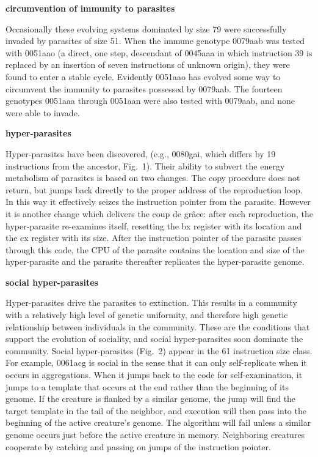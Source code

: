 \pagebreak
\LP
\bf circumvention of immunity to parasites\rm
\eLP

Occasionally these evolving systems dominated by size 79 were successfully
invaded by parasites of size 51.  When the immune genotype 0079aab was tested
with 0051aao (a direct, one step, descendant of 0045aaa in which instruction
39 is replaced by an insertion of seven instructions of unknown origin), they
were found to enter a stable cycle.  Evidently 0051aao has evolved some way to
circumvent the immunity to parasites possessed by 0079aab.  The fourteen
genotypes 0051aaa through 0051aan were also tested with 0079aab, and none were
able to invade.

\LP
\bf hyper-parasites\rm
\eLP

Hyper-parasites have been discovered, (e.g., 0080gai, which differs by 19
instructions from the ancestor, Fig.\ 1).  Their ability to subvert the energy
metabolism of parasites is based on two changes.  The copy procedure does not
return, but jumps back directly to the proper address of the reproduction loop.
In this way it effectively seizes the instruction pointer from the parasite.
However it is another change which delivers the coup de gr\^{a}ce: after
each reproduction, the hyper-parasite re-examines itself, resetting the bx
register with its location and the cx register with its size.  After the
instruction pointer of the parasite passes through this code, the CPU of the
parasite contains the location and size of the hyper-parasite and the
parasite thereafter replicates the hyper-parasite genome.

\LP
\bf social hyper-parasites\rm
\eLP

Hyper-parasites drive the parasites to extinction.  This results in a
community with a relatively high level of genetic uniformity, and therefore
high genetic relationship between individuals in the community.  These are
the conditions that support the evolution of sociality, and social
hyper-parasites soon dominate the community.  Social hyper-parasites (Fig.\ 2)
appear in the 61 instruction size class.  For example, 0061acg is social in
the sense that it can only self-replicate when it occurs in aggregations.
When it jumps back to the code for self-examination, it jumps to a template
that occurs at the end rather than the beginning of its genome.  If the
creature is flanked by a similar genome, the jump will find the target
template in the tail of the neighbor, and execution will then pass into
the beginning of the active creature's genome.  The algorithm will fail unless
a similar genome occurs just before the active creature in memory.  Neighboring
creatures cooperate by catching and passing on jumps of the instruction
pointer.

